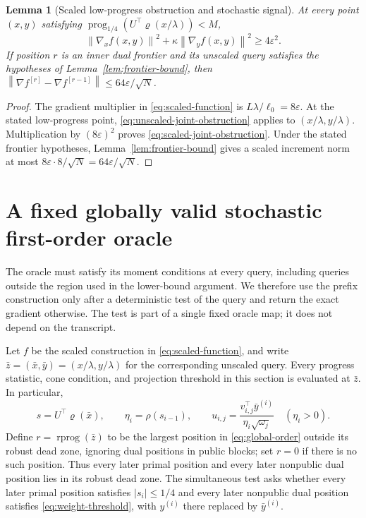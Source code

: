 \documentclass[11pt,a4paper]{article}
\newcommand{\eps}{\varepsilon}
\newcommand{\norm}[1]{\left\lVert #1\right\rVert}
\newcommand{\rprog}{\operatorname{rprog}}
\newcommand{\prog}{\operatorname{prog}}
\newtheorem{lemma}[theorem]{Lemma}
\theoremstyle{definition}
\theoremstyle{remark}
\numberwithin{equation}{section}
\begin{document}
\begin{lemma}[Scaled low-progress obstruction and stochastic signal]
\label{lem:scaled-obstruction}
At every point $(x,y)$ satisfying
$\prog_{1/4}(U^\top\varrho(x/\lambda))<M$,
\begin{equation}
 \norm{\nabla_x f(x,y)}^2
 +\kappa\norm{\nabla_y f(x,y)}^2\ge4\eps^2.
 \label{eq:scaled-joint-obstruction}
\end{equation}
If position $r$ is an inner dual frontier and its unscaled query
satisfies the hypotheses of Lemma~\ref{lem:frontier-bound}, then
$\norm{\nabla f^{[r]}-\nabla f^{[r-1]}}\le64\eps/\sqrt N$.
\end{lemma}

\begin{proof}
The gradient multiplier in \eqref{eq:scaled-function} is
$L\lambda/\ell_0=8\eps$.  At the stated low-progress point,
\eqref{eq:unscaled-joint-obstruction} applies to $(x/\lambda,y/\lambda)$.
Multiplication by $(8\eps)^2$ proves
\eqref{eq:scaled-joint-obstruction}.  Under the stated frontier hypotheses,
Lemma~\ref{lem:frontier-bound} gives a scaled increment norm at most
$8\eps\cdot8/\sqrt N=64\eps/\sqrt N$.
\end{proof}

\section{A fixed globally valid stochastic first-order oracle}
\label{sec:oracle}

The oracle must satisfy its moment conditions at every query, including queries
outside the region used in the lower-bound argument.  We therefore use the
prefix construction only after a deterministic test of the query and return
the exact gradient otherwise.  The test is part of a single fixed oracle map;
it does not depend on the transcript.

Let $f$ be the scaled construction in \eqref{eq:scaled-function}, and write
$\bar z=(\bar x,\bar y)=(x/\lambda,y/\lambda)$ for the corresponding unscaled
query.  Every progress statistic, cone condition, and projection threshold in
this section is evaluated at $\bar z$.  In particular,
\[
 s=U^\top\varrho(\bar x),\qquad
 \eta_i=\rho(s_{i-1}),\qquad
 u_{i,j}=\frac{v_{i,j}^\top\bar y^{(i)}}{\eta_i\sqrt{\omega_j}}
 \quad(\eta_i>0).
\]
Define $r=\rprog(\bar z)$ to be the largest position in
\eqref{eq:global-order} outside its robust dead zone, ignoring dual positions
in public blocks; set $r=0$ if there is no such position.  Thus every later primal position and every later nonpublic dual
position lies in its robust dead zone.  The simultaneous test asks whether
every later primal position satisfies $|s_i|\le1/4$ and every later nonpublic
dual position satisfies \eqref{eq:weight-threshold}, with $y^{(i)}$ there
replaced by $\bar y^{(i)}$.
\end{document}
